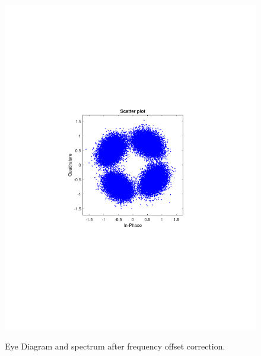\begin{refsection}
\begin{figure}[H]
\begin{minipage}{0.30\textwidth}
		\includegraphics[clip, trim=4cm 8cm 4cm 8cm, width=1\textwidth]{./sdf/m_qam_system/figures/expResults/homodyne/4_const_4GBdInSig13dBc_AfFE.pdf}
		\label{fig:4GBdSpecBefFec}
	\end{minipage}
	\caption{Eye Diagram and spectrum after frequency offset correction.}
\end{figure}


\end{refsection}
